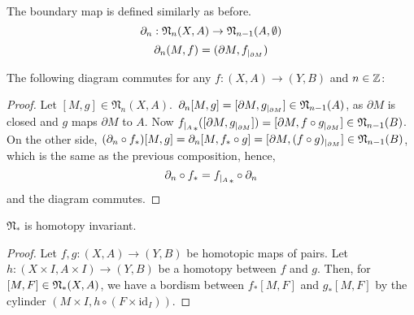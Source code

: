 \documentclass[a4paper,11pt]{article}
\begin{document}
The boundary map is defined similarly as before.
\[\partial_n:\mathfrak{N}_n(X,A)\to\mathfrak{N}_{n-1}(A,\emptyset)\]
\[\partial_n(M, f)=(\partial M,f_{|_{\partial M}})\]

\begin{lemma}\label{naturality}
    The following diagram commutes for any \(f:(X,A)\to(Y,B)\) and \(n\in\mathbb{Z}\): %
    \begin{center}
    \end{center}
\end{lemma}

\begin{proof}
    Let \([M,g]\in\mathfrak{N}_n(X,A)\).\ \(\partial_n[M,g]=[\partial M, g_{|_{\partial M}}]\in\mathfrak{N}_{n-1}(A)\), as \(\partial M\) is closed and \(g\) maps \(\partial M\) to \(A\). %
    Now \({f_{|_{A}}}_\ast([\partial M,g_{|_{\partial M}}])=[\partial M,f\circ g_{|_{\partial M}}]\in \mathfrak{N}_{n-1}(B)\).\\
    On the other side, \((\partial_n\circ f_\ast)[M,g]=\partial_n [M,f_\ast\circ g]=[\partial M,(f\circ g)_{|_{\partial M}}]\in \mathfrak{N}_{n-1}(B)\), which is the same as the previous composition, hence,
    \[\partial_n\circ f_\ast={f_{|_{A}}}_\ast\circ \partial_n\]
    and the diagram commutes.
\end{proof}

\begin{lemma}\cite[II, Satz 3.1]{brocker}\label{htpy inv}
    \(\mathfrak{N}_\ast\) is homotopy invariant.
\end{lemma}

\begin{proof}\cite{brocker}\cite[Chapter I, 5.5]{conner}
    Let \(f,g:(X,A)\to(Y,B)\) be homotopic maps of pairs. Let \(h:(X\times I,A\times I)\to (Y,B)\) be a homotopy between \(f\) and \(g\). Then, for \([M,F]\in\mathfrak{N}_\ast(X,A)\), we have a bordism between \(f_\ast[M,F]\) and \(g_\ast[M,F]\) by the cylinder \((M\times I, h\circ (F\times\mathrm{id}_I))\).
\end{proof}
\end{document}
